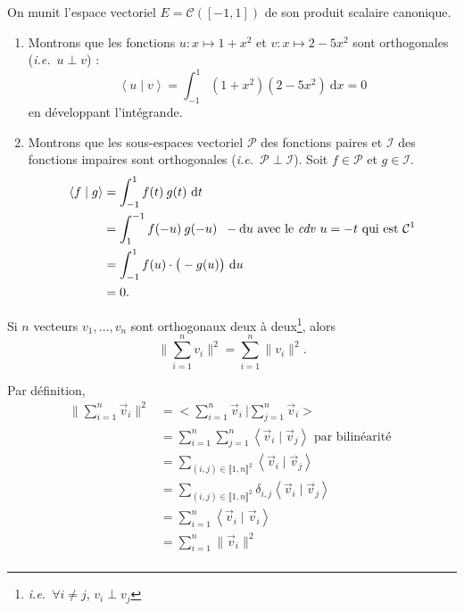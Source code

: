 \begin{exm}
	On munit l'espace vectoriel $E = \mathcal{C}([-1,1])$\/ de son produit scalaire canonique.
	\begin{enumerate}
		\item Montrons que les fonctions $u : x\mapsto 1 + x^2$\/ et $v : x \mapsto 2 - 5x^2$\/ sont orthogonales (\textit{i.e.}\ $u \perp v$) : \[
				\left<u \mid v \right> = \int_{-1}^{1} (1+x^2)(2-5x^2)~\mathrm{d}x = 0
			\] en développant l'intégrande.
		\item Montrons que les sous-espaces vectoriel $\mathcal{P}$\/ des fonctions paires et $\mathcal{I}$ des fonctions impaires sont orthogonales (\textit{i.e.}\ $\mathcal{P} \perp \mathcal{I}$). Soit $f \in \mathcal{P}$\/ et $g \in \mathcal{I}$.
			\begin{align*}
				\left<f  \mid g \right> &= \int_{-1}^{1} f(t)\:g(t)~\mathrm{d}t\\
				&= \int_{1}^{-1} f(-u)\:g(-u)\:~-\mathrm{d}u \text{ avec le \textit{cdv} $u = -t$\/ qui est $\mathcal{C}^1$\/}  \\
				&= \int_{-1}^{1}  f(u) \cdot \big(-g(u)\big)~\mathrm{d}u \\
				&= 0. \\
			\end{align*}
	\end{enumerate}
\end{exm}

\begin{prop}
	Si $n$\/ vecteurs $v_1,\ldots,v_n$\/ sont orthogonaux deux à deux\footnote{\textit{i.e.}\ $\forall i \neq j$, $v_i \perp v_j$}, alors \[
		\Big\|\sum_{i=1}^n v_i\Big\|^2 \!= \sum_{i=1}^n \|v_i\|^2
	.\]
\end{prop}

\begin{prv}
	Par définition,
	\begin{align*}
		\Big\| \sum_{i=1}^n \vec{v}_i \Big\|^2 &= \Big< \sum_{i=1}^n \vec{v}_i\:\Big|\sum_{j=1}^n \vec{v}_i \Big> \\
		&= \sum_{i=1}^n \sum_{j=1}^n \left<\vec{v}_i  \mid \vec{v}_j \right> \text{ par bilinéarité } \\
		&= \sum_{(i,j) \in \llbracket 1,n\rrbracket^2} \left<\vec{v}_i  \mid \vec{v}_j\right> \\
		&= \sum_{(i,j) \in \llbracket 1,n\rrbracket^2} \delta_{i,j} \left<\vec{v}_i  \mid \vec{v}_j\right> \\
		&= \sum_{i=1}^n \left<\vec{v}_i  \mid \vec{v}_i \right> \\
		&= \sum_{i=1}^n \|\vec{v}_i\|^2 \\
	\end{align*}
\end{prv}

